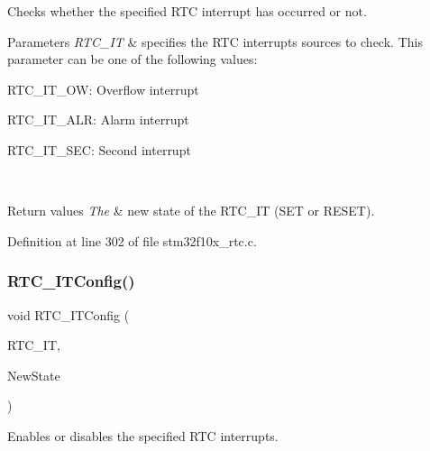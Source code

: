 Checks whether the specified R\+TC interrupt has occurred or not. 


\begin{DoxyParams}{Parameters}
{\em R\+T\+C\+\_\+\+IT} & specifies the R\+TC interrupts sources to check. This parameter can be one of the following values\+: \begin{DoxyItemize}
\item R\+T\+C\+\_\+\+I\+T\+\_\+\+OW\+: Overflow interrupt \item R\+T\+C\+\_\+\+I\+T\+\_\+\+A\+LR\+: Alarm interrupt \item R\+T\+C\+\_\+\+I\+T\+\_\+\+S\+EC\+: Second interrupt \end{DoxyItemize}
\\
\hline
\end{DoxyParams}

\begin{DoxyRetVals}{Return values}
{\em The} & new state of the R\+T\+C\+\_\+\+IT (S\+ET or R\+E\+S\+ET). \\
\hline
\end{DoxyRetVals}


Definition at line 302 of file stm32f10x\+\_\+rtc.\+c.

\mbox{\label{group___r_t_c___exported___functions_ga175dfe88866234730c1ec40d2221c4f4}} 
\subsubsection{\texorpdfstring{R\+T\+C\+\_\+\+I\+T\+Config()}{RTC\_ITConfig()}}
{\footnotesize\ttfamily void R\+T\+C\+\_\+\+I\+T\+Config (\begin{DoxyParamCaption}\item[{uint16\+\_\+t}]{R\+T\+C\+\_\+\+IT,  }\item[{\hyperlink{group___exported__types_gac9a7e9a35d2513ec15c3b537aaa4fba1}{Functional\+State}}]{New\+State }\end{DoxyParamCaption})}



Enables or disables the specified R\+TC interrupts. 


